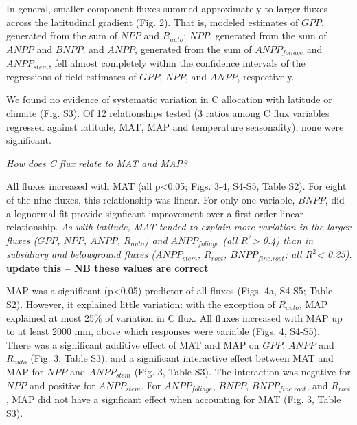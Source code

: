 \documentclass[
]{article}
\begin{document}
In general, smaller component fluxes summed approximately to larger
fluxes across the latitudinal gradient (Fig. 2). That is, modeled
estimates of \(GPP\), generated from the sum of \(NPP\) and
\(R_{auto}\); \(NPP\), generated from the sum of \(ANPP\) and \(BNPP\);
and \(ANPP\), generated from the sum of \(ANPP_{foliage}\) and
\(ANPP_{stem}\), fell almost completely within the confidence intervals
of the regressions of field estimates of \(GPP\), \(NPP\), and \(ANPP\),
respectively.

We found no evidence of systematic variation in C allocation with
latitude or climate (Fig. S3). Of 12 relationships tested (3 ratios
among C flux variables regressed against latitude, MAT, MAP and
temperature seasonality), none were significant.

\emph{How does C flux relate to MAT and MAP?}

All fluxes increased with MAT (all p\textless0.05; Figs. 3-4, S4-S5,
Table S2). For eight of the nine fluxes, this relationship was linear.
For only one variable, \(BNPP\), did a lognormal fit provide signficant
improvement over a first-order linear relationship. \emph{As with
latitude, MAT tended to explain more variation in the larger fluxes
(\(GPP\), \(NPP\), \(ANPP\), \(R_{auto}\)) and \(ANPP_{foliage}\) (all
\(R^2\)\textgreater{} 0.4) than in subsidiary and belowground fluxes
(\(ANPP_{stem}\), \(R_{root}\), \(BNPP_{fine.root}\); all
\(R^2\)\textless{} 0.25).} \textbf{update this -- NB these values are
correct}

MAP was a significant (p\textless0.05) predictor of all fluxes (Figs.
4a, S4-S5; Table S2). However, it explained little variation: with the
exception of \(R_{auto}\), MAP explained at most 25\% of variation in C
flux. All fluxes increased with MAP up to at least 2000 mm, above which
responses were variable (Figs. 4, S4-S5).\\
There was a significant additive effect of MAT and MAP on \(GPP\),
\(ANPP\) and \(R_{auto}\) (Fig. 3, Table S3), and a significant
interactive effect between MAT and MAP for \(NPP\) and \(ANPP_{stem}\)
(Fig. 3, Table S3). The interaction was negative for \(NPP\) and
positive for \(ANPP_{stem}\). For \(ANPP_{foliage}\), \(BNPP\),
\(BNPP_{fine.root}\), and \(R_{root}\), MAP did not have a signficant
effect when accounting for MAT (Fig. 3, Table S3).
\end{document}
